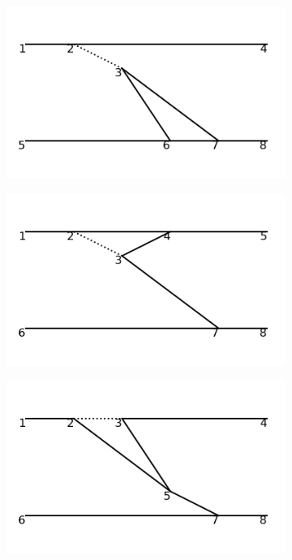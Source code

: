 \documentclass[11pt,a4paper,twoside,pdf]{article}
\numberwithin{equation}{section}
\begin{document}
\begin{figure}[h!]
\begin{subfigure}[t]{0.16\textwidth}
    \end{subfigure}
    \hfill
    \begin{subfigure}[t]{0.16\textwidth}
        \centering
        \includegraphics[width=\textwidth]{plots/order4_2to2/16.png}
    \end{subfigure}
    \hfill
    \begin{subfigure}[t]{0.16\textwidth}
        \centering
        \includegraphics[width=\textwidth]{plots/order4_2to2/17.png}
    \end{subfigure}
    \hfill
    \begin{subfigure}[t]{0.16\textwidth}
        \centering
        \includegraphics[width=\textwidth]{plots/order4_2to2/18.png}

\end{subfigure}
\end{figure}
\end{document}
